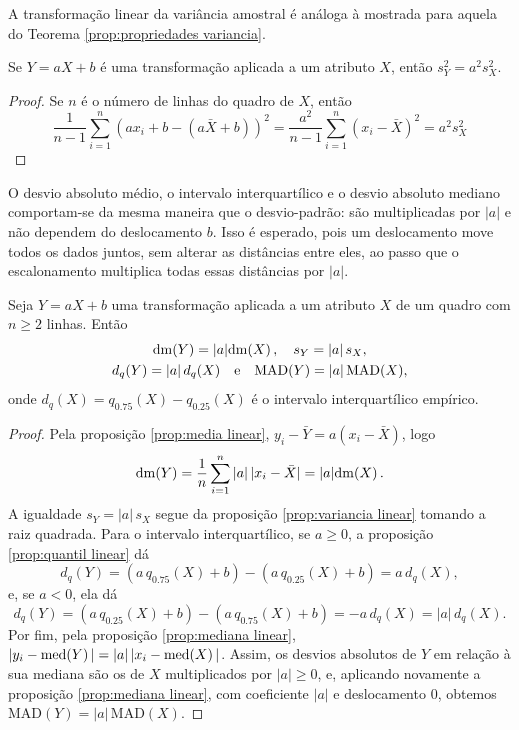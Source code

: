 A transformação linear da variância amostral é análoga à mostrada para aquela do
Teorema \ref{prop:propriedades variancia}.

\begin{prop:variancia linear}
\label{prop:variancia linear}
Se $Y=aX+b$ é uma transformação aplicada a um atributo $X$, então $s_Y^2=a^2 s_X^2$.
\end{prop:variancia linear}
\begin{proof}
Se $n$ é o número de linhas do quadro de $X$, então
\[
   \frac{1}{n-1} \sum_{i=1}^n (ax_i+b - (a\bar X+b))^2 =
   \frac{a^2}{n-1} \sum_{i=1}^n (x_i - \bar X)^2 =
   a^2 s_X^2
\]
\end{proof}

O desvio absoluto médio, o intervalo interquartílico e o desvio absoluto mediano
comportam-se da mesma maneira que o desvio-padrão:
são multiplicadas por $|a|$ e não dependem do deslocamento $b$.
Isso é esperado, pois um deslocamento move todos os dados juntos, sem alterar as
distâncias entre eles, ao passo que o escalonamento multiplica todas essas distâncias
por $|a|$.

\begin{prop:dispersao linear}
\label{prop:dispersao linear}
Seja $Y=aX+b$ uma transformação aplicada a um atributo $X$ de um quadro com $n \ge 2$
linhas.
Então
\begin{gather*}
    \mathrm{dm}\!\left(Y\right) = |a| \mathrm{dm}\!\left(X\right), \quad s_Y = |a|\, s_X, \\
    d_q(Y) = |a|\, d_q(X) \quad \text{e} \quad
    \mathrm{MAD}(Y) = |a|\, \mathrm{MAD}(X),
\end{gather*}
onde $d_q(X) = q_{0.75}(X) - q_{0.25}(X)$ é o intervalo interquartílico empírico.
\end{prop:dispersao linear}
\begin{proof}
Pela proposição \ref{prop:media linear}, $y_i - \bar Y = a(x_i - \bar X)$, logo
\[
    \mathrm{dm}\!\left(Y\right) = \frac 1 n \sum_{i=1}^n |a|\,|x_i - \bar X| = |a| \mathrm{dm}\!\left(X\right).
\]
A igualdade $s_Y = |a|\, s_X$ segue da proposição \ref{prop:variancia linear} tomando a
raiz quadrada.
Para o intervalo interquartílico, se $a \ge 0$, a proposição \ref{prop:quantil linear} dá
\[
    d_q(Y) = (a\, q_{0.75}(X) + b) - (a\, q_{0.25}(X) + b) = a\, d_q(X),
\]
e, se $a < 0$, ela dá
\[
    d_q(Y) = (a\, q_{0.25}(X) + b) - (a\, q_{0.75}(X) + b) = -a\, d_q(X) = |a|\, d_q(X).
\]
Por fim, pela proposição \ref{prop:mediana linear}, $|y_i - \mathrm{med}\!\left(Y\right)| = |a|\,|x_i - \mathrm{med}\!\left(X\right)|$.
Assim, os desvios absolutos de $Y$ em relação à sua mediana são os de $X$ multiplicados
por $|a| \ge 0$, e, aplicando novamente a proposição \ref{prop:mediana linear}, com
coeficiente $|a|$ e deslocamento $0$, obtemos $\mathrm{MAD}(Y) = |a|\, \mathrm{MAD}(X)$.
\end{proof}

